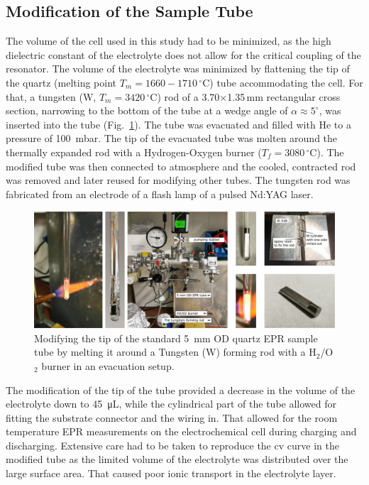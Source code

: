\subsection{Modification of the Sample Tube}
\label{sec:flat_tube_fab}
The volume of the cell used in this study had to be minimized, as the high dielectric constant of the electrolyte does not allow for the critical coupling of the resonator. The volume of the electrolyte was minimized by flattening the tip of the quartz (melting point $T_m=1660-1710\,^{\circ}$C) tube accommodating the cell. For that, a tungsten (W, $T_m=3420\,^{\circ}$C) rod of a 3.70$\times$1.35$\,$mm rectangular cross section, narrowing to the bottom of the tube at a wedge angle of $\alpha \approx 5 ^{\circ}$, was inserted into the tube (Fig.~\ref{fig:S1_modified_tube}). The tube was evacuated and filled with He to a pressure of 100~mbar. The tip of the evacuated tube was molten around the thermally expanded rod with a Hydrogen-Oxygen burner ($T_f = 3080\,^{\circ}$C). The modified tube was then connected to atmosphere and the cooled, contracted rod was removed and later reused for modifying other tubes. The tungsten rod was fabricated from an electrode of a flash lamp of a pulsed Nd:YAG laser.\\

\begin{figure}[h]
\centering
\includegraphics[width=1\textwidth]{./operando_epr/figures/spins_at_work/Figure_S1.pdf}
\caption{Modifying the tip of the standard 5~mm OD quartz EPR sample tube by melting it around a Tungsten (W) forming rod with a H$_2$/O$_2$ burner in an evacuation setup.}
\label{fig:S1_modified_tube}
\end{figure}

The modification of the tip of the tube provided a decrease in the volume of the electrolyte down to \SI{45}{\micro\liter}, while the cylindrical part of the tube allowed for fitting the substrate connector and the wiring in. That allowed for the room temperature EPR measurements on the electrochemical cell during charging and discharging. Extensive care had to be taken to reproduce the cv curve in the modified tube as the limited volume of the electrolyte was distributed over the large surface area. That caused poor ionic transport in the electrolyte layer.\\


